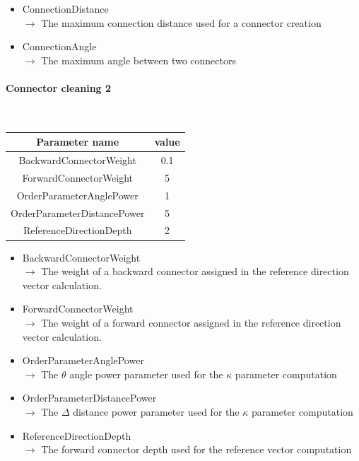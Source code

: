 \documentclass[cits]{JINST}
\begin{document}
\begin{itemize}
  \item ConnectionDistance \\
  $\rightarrow$ The maximum connection distance used for a connector creation
  \item ConnectionAngle \\
  $\rightarrow$ The maximum angle between two connectors
\end{itemize}


\newpage
\paragraph{Connector cleaning 2} ~

\begin{table}[!ht]
  \begin{center}
    \begin{tabu} to \linewidth { c | c } 
          Parameter name & value \\
          \hline
          BackwardConnectorWeight & 0.1 \\
          ForwardConnectorWeight & 5 \\
          OrderParameterAnglePower & 1 \\
          OrderParameterDistancePower & 5 \\
          ReferenceDirectionDepth & 2
    \end{tabu} 
  \end{center}
\end{table}

\begin{itemize}
  \item BackwardConnectorWeight \\
  $\rightarrow$ The weight of a backward connector assigned in the reference direction vector calculation.
  \item ForwardConnectorWeight \\
  $\rightarrow$ The weight of a forward connector assigned in the reference direction vector calculation.
  \item OrderParameterAnglePower \\
  $\rightarrow$ The $\theta$ angle power parameter used for the $\kappa$ parameter computation
  \item OrderParameterDistancePower \\
  $\rightarrow$ The $\Delta$ distance power parameter used for the $\kappa$ parameter computation
  \item ReferenceDirectionDepth \\
  $\rightarrow$ The forward connector depth used for the reference vector computation
\end{itemize}
\end{document}
